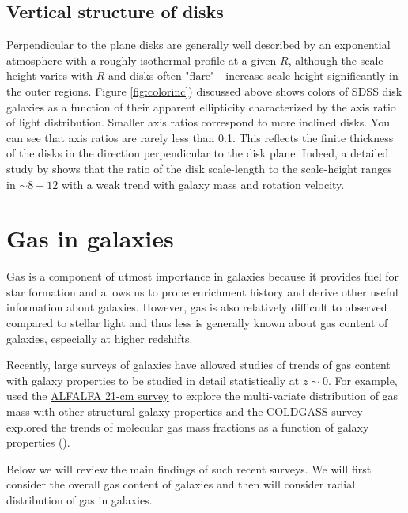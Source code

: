 \subsection{Vertical structure of disks}

Perpendicular to the plane disks are generally well described by an exponential atmosphere with a roughly isothermal profile at a given $R$, although the scale height varies with $R$ and disks often "flare" - increase scale height significantly in the outer regions. 
Figure \ref{fig:colorinc}) discussed above shows colors of SDSS disk galaxies as a function of their apparent ellipticity characterized by the axis ratio of light distribution. Smaller axis ratios correspond to more inclined disks. 
You can see that axis ratios are rarely less than 0.1. This reflects the finite thickness of the disks
in the direction perpendicular to the disk plane.  Indeed, a detailed study by \href{http://adsabs.harvard.edu/abs/2006AJ....131..226Y}{\citet{yoachim_dalcanton06}} shows that the ratio of the disk scale-length to the scale-height ranges in $\sim 8-12$ with a weak trend with galaxy mass and rotation velocity.

\section{Gas in galaxies}
\label{sec:gas}

Gas is a component of utmost importance in galaxies because it provides fuel for star formation and allows us to probe enrichment history and derive other useful information about galaxies. However, gas is also relatively difficult to observed compared to stellar light and thus less is generally known about gas content of galaxies, especially at higher redshifts.  

Recently, large surveys of galaxies have allowed studies of trends of gas content with galaxy properties to be studied in detail statistically at $z\sim 0$. For example, \href{http://adsabs.harvard.edu/abs/2011ApJ...732...93T}{\citet{toribio_etal11}} used the \href{http://egg.astro.cornell.edu/alfalfa/index.php}{ALFALFA 21-cm survey} to explore the multi-variate distribution of gas mass with other structural galaxy properties and the COLDGASS survey explored the trends of molecular gas mass fractions as a function of galaxy properties (\href{http://adsabs.harvard.edu/abs/2011MNRAS.415...32S}{\citealt{saintonge_etal11}}). 

Below we will review the main findings of such recent surveys. We will first consider the overall gas content of galaxies and then will consider radial distribution of gas in galaxies. 

